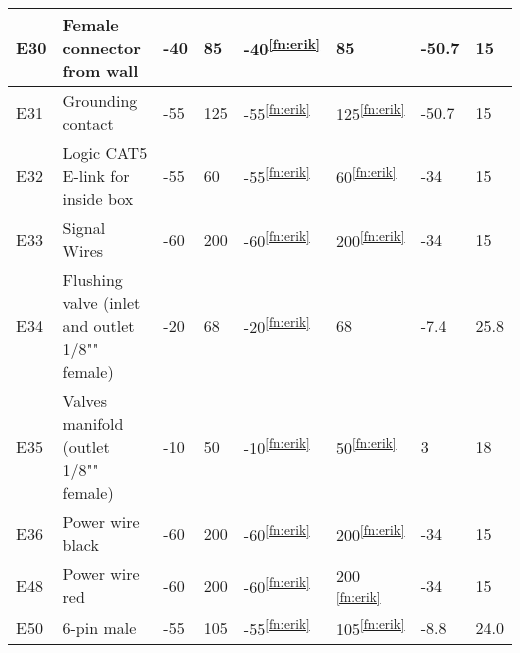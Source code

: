 \begin{longtable}{|m{1cm}|m{3.5cm}|m{1.3cm}|m{1.3cm}|m{1.4cm}|m{1.3cm}|m{1.3cm}|m{1.3cm}|}
E30 & Female connector from wall & -40 & 85 & -40\textsuperscript{\ref{fn:erik}} & 85 & -50.7 & 15 \\ \hline
E31 & Grounding contact & -55 & 125 & -55\textsuperscript{\ref{fn:erik}} & 125\textsuperscript{\ref{fn:erik}} & -50.7 & 15 \\ \hline
E32 & Logic CAT5 E-link for inside box &-55 & 60 & -55\textsuperscript{\ref{fn:erik}} & 60\textsuperscript{\ref{fn:erik}} & -34 & 15 \\ \hline
E33 & Signal Wires & -60 & 200 & -60\textsuperscript{\ref{fn:erik}} & 200\textsuperscript{\ref{fn:erik}} & -34 & 15 \\ \hline
E34 & Flushing valve (inlet and outlet 1/8"" female) & -20 & 68 & -20\textsuperscript{\ref{fn:erik}} & 68 & -7.4 & 25.8 \\ \hline
E35 & Valves manifold (outlet 1/8"" female) & -10 & 50 & -10\textsuperscript{\ref{fn:erik}} & 50\textsuperscript{\ref{fn:erik}} & 3 & 18 \\ \hline
E36 & Power wire black & -60 & 200 & -60\textsuperscript{\ref{fn:erik}} & 200\textsuperscript{\ref{fn:erik}} & -34 & 15 \\ \hline
E48 & Power wire red & -60 & 200 & -60\textsuperscript{\ref{fn:erik}} & 200
\textsuperscript{\ref{fn:erik}} & -34 & 15  \\ \hline
E50 & 6-pin male & -55 & 105 & -55\textsuperscript{\ref{fn:erik}} & 105\textsuperscript{\ref{fn:erik}} & -8.8 & 24.0  \\ \hline

\end{longtable}
